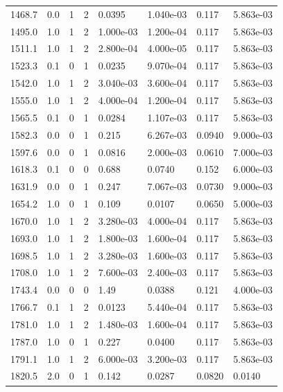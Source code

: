 \documentclass[preview]{standalone}
\begin{document}
{{{{\begin{tabular}{L{1.2cm}C{1.2cm} C{0.3cm}C{0.5cm} C{1.4cm}C{1.4cm} C{1.4cm}C{1.4cm}}
  1468.7  &   0.0  & 1     &  2 &  0.0395  & 1.040e-03  & 0.117 &  5.863e-03   \\ 
  1495.0  &   1.0  & 1     &  2 &  1.000e-03  & 1.200e-04  & 0.117 &  5.863e-03   \\ 
  1511.1  &   1.0  & 1     &  2 &  2.800e-04  & 4.000e-05  & 0.117 &  5.863e-03   \\ 
  1523.3  &   0.1  & 0     &  1 &  0.0235  & 9.070e-04  & 0.117 &  5.863e-03   \\ 
  1542.0  &   1.0  & 1     &  2 &  3.040e-03  & 3.600e-04  & 0.117 &  5.863e-03   \\ 
  1555.0  &   1.0  & 1     &  2 &  4.000e-04  & 1.200e-04  & 0.117 &  5.863e-03   \\ 
  1565.5  &   0.1  & 0     &  1 &  0.0284  & 1.107e-03  & 0.117 &  5.863e-03   \\ 
  1582.3  &   0.0  & 0     &  1 &  0.215  & 6.267e-03  & 0.0940 &  9.000e-03   \\ 
  1597.6  &   0.0  & 0     &  1 &  0.0816  & 2.000e-03  & 0.0610 &  7.000e-03   \\ 
  1618.3  &   0.1  & 0     &  0 &  0.688  & 0.0740  & 0.152 &  6.000e-03   \\ 
  1631.9  &   0.0  & 0     &  1 &  0.247  & 7.067e-03  & 0.0730 &  9.000e-03   \\ 
  1654.2  &   1.0  & 0     &  1 &  0.109  & 0.0107  & 0.0650 &  5.000e-03   \\ 
  1670.0  &   1.0  & 1     &  2 &  3.280e-03  & 4.000e-04  & 0.117 &  5.863e-03   \\ 
  1693.0  &   1.0  & 1     &  2 &  1.800e-03  & 1.600e-04  & 0.117 &  5.863e-03   \\ 
  1698.5  &   1.0  & 1     &  2 &  3.280e-03  & 1.600e-03  & 0.117 &  5.863e-03   \\ 
  1708.0  &   1.0  & 1     &  2 &  7.600e-03  & 2.400e-03  & 0.117 &  5.863e-03   \\ 
  1743.4  &   0.0  & 0     &  0 &  1.49  & 0.0388  & 0.121 &  4.000e-03   \\ 
  1766.7  &   0.1  & 1     &  2 &  0.0123  & 5.440e-04  & 0.117 &  5.863e-03   \\ 
  1781.0  &   1.0  & 1     &  2 &  1.480e-03  & 1.600e-04  & 0.117 &  5.863e-03   \\ 
  1787.0  &   1.0  & 0     &  1 &  0.227  & 0.0400  & 0.117 &  5.863e-03   \\ 
  1791.1  &   1.0  & 1     &  2 &  6.000e-03  & 3.200e-03  & 0.117 &  5.863e-03   \\ 
  1820.5  &   2.0  & 0     &  1 &  0.142  & 0.0287  & 0.0820 &  0.0140   \\ 

\end{tabular}}}}}
\end{document}
